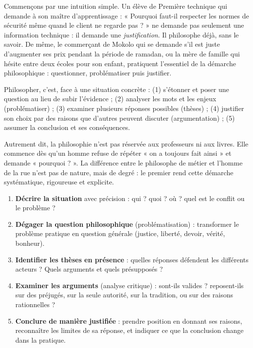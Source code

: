 \documentclass[11pt]{article}
\newcommand{\cle}[1]{{\popxbold\color{popdark}#1}}
\newcounter{popsec}
\newcounter{popsub}
\newcommand{\courssub}[1]{%
  \stepcounter{popsub}%
  \par\vspace{9pt}\noindent{\popxbold\fontsize{11.5}{13}\selectfont\color{popink}{\color{poporange}\thepopsec.\thepopsub}\hspace{6pt}#1}\par\nopagebreak\vspace{4pt}
}
\begin{document}
\courssub{La philosophie comme activité quotidienne}

Commençons par une intuition simple. Un élève de Première technique qui demande à son maître d'apprentissage : « Pourquoi faut-il respecter les normes de sécurité même quand le client ne regarde pas ? » ne demande pas seulement une information technique : il demande une \emph{justification}. Il philosophe déjà, sans le savoir. De même, le commerçant de Mokolo qui se demande s'il est juste d'augmenter ses prix pendant la période de ramadan, ou la mère de famille qui hésite entre deux écoles pour son enfant, pratiquent l'essentiel de la démarche philosophique : \cle{questionner}, \cle{problématiser} puis \cle{justifier}.

\begin{definition}
Philosopher, c'est, face à une situation concrète : (1) s'étonner et poser une question au lieu de subir l'évidence ; (2) analyser les mots et les enjeux (problématiser) ; (3) examiner plusieurs réponses possibles (thèses) ; (4) justifier son choix par des raisons que d'autres peuvent discuter (argumentation) ; (5) assumer la conclusion et ses conséquences.
\end{definition}

Autrement dit, la philosophie n'est pas réservée aux professeurs ni aux livres. Elle commence dès qu'un homme refuse de répéter « on a toujours fait ainsi » et demande « pourquoi ? ». La différence entre le philosophe de métier et l'homme de la rue n'est pas de nature, mais de degré : le premier rend cette démarche systématique, rigoureuse et explicite.

\begin{methode}
\begin{enumerate}
\item \textbf{Décrire la situation} avec précision : qui ? quoi ? où ? quel est le conflit ou le problème ?
\item \textbf{Dégager la question philosophique} (problématisation) : transformer le problème pratique en question générale (justice, liberté, devoir, vérité, bonheur).
\item \textbf{Identifier les thèses en présence} : quelles réponses défendent les différents acteurs ? Quels arguments et quels présupposés ?
\item \textbf{Examiner les arguments} (analyse critique) : sont-ils valides ? reposent-ils sur des préjugés, sur la seule autorité, sur la tradition, ou sur des raisons rationnelles ?
\item \textbf{Conclure de manière justifiée} : prendre position en donnant ses raisons, reconnaître les limites de sa réponse, et indiquer ce que la conclusion change dans la pratique.
\end{enumerate}
\end{methode}
\end{document}
